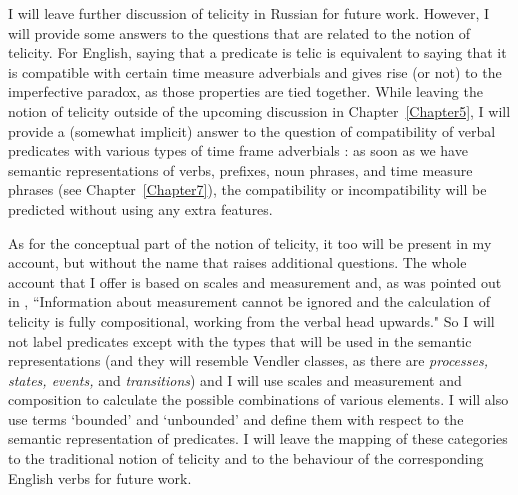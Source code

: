  
 
I will leave further discussion of telicity in Russian for future  work. However, I will provide some answers to the questions that are related to the notion of telicity. For English, saying that a predicate is telic is equivalent to saying that it is compatible with certain time measure adverbials and gives rise (or not) to the imperfective paradox, as those properties are tied together. While leaving the notion of telicity outside of the upcoming discussion in Chapter~\ref{Chapter5}, I will provide a (somewhat implicit) answer to the question of compatibility of verbal predicates with various types of time frame adverbials : as soon as we have semantic representations of verbs, prefixes, noun phrases, and time measure phrases (see Chapter~\ref{Chapter7}), the compatibility or incompatibility will be predicted without using any extra features.

As for the conceptual part of the notion of telicity, it too will be present in my account, but without the name that raises additional questions. The whole account that I offer is based on scales and measurement and, as was pointed out in \citet[60]{Rothstein:08}, ``Information about measurement cannot be ignored and the calculation of telicity is fully compositional, working from the verbal head upwards." So I will not label predicates except with the types that will be used in the semantic representations (and they will resemble Vendler classes, as there are \textit{processes, states, events,} and \textit{transitions}) and I will use scales and measurement and composition to calculate the possible combinations of various elements. I will also use terms `bounded' and `unbounded' and define them with respect to the semantic representation of predicates. I will leave the mapping of these categories to the traditional notion of telicity and to the behaviour of the corresponding English verbs for future  work.
 
